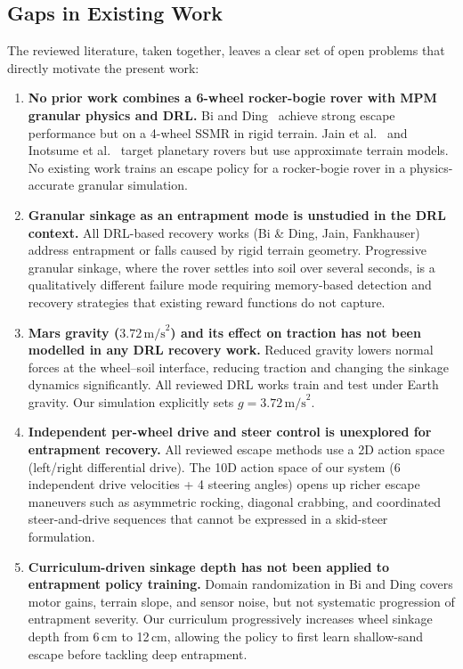 \documentclass[12pt,a4paper]{article}
\begin{document}
\subsection{Gaps in Existing Work}

The reviewed literature, taken together, leaves a clear set of open problems that directly motivate the present work:

\begin{enumerate}

    \item \textbf{No prior work combines a 6-wheel rocker-bogie rover with MPM granular physics and DRL.}
    Bi and Ding~\cite{bi2026escape} achieve strong escape performance but on a 4-wheel SSMR in rigid terrain. Jain et al.~\cite{jain2019} and Inotsume et al.~\cite{inotsume2020} target planetary rovers but use approximate terrain models. No existing work trains an escape policy for a rocker-bogie rover in a physics-accurate granular simulation.

    \item \textbf{Granular sinkage as an entrapment mode is unstudied in the DRL context.}
    All DRL-based recovery works (Bi \& Ding, Jain, Fankhauser) address entrapment or falls caused by rigid terrain geometry. Progressive granular sinkage, where the rover settles into soil over several seconds, is a qualitatively different failure mode requiring memory-based detection and recovery strategies that existing reward functions do not capture.

    \item \textbf{Mars gravity ($3.72\,\text{m/s}^2$) and its effect on traction has not been modelled in any DRL recovery work.}
    Reduced gravity lowers normal forces at the wheel--soil interface, reducing traction and changing the sinkage dynamics significantly. All reviewed DRL works train and test under Earth gravity. Our simulation explicitly sets $g = 3.72\,\text{m/s}^2$.

    \item \textbf{Independent per-wheel drive and steer control is unexplored for entrapment recovery.}
    All reviewed escape methods use a 2D action space (left/right differential drive). The 10D action space of our system (6 independent drive velocities + 4 steering angles) opens up richer escape maneuvers such as asymmetric rocking, diagonal crabbing, and coordinated steer-and-drive sequences that cannot be expressed in a skid-steer formulation.

    \item \textbf{Curriculum-driven sinkage depth has not been applied to entrapment policy training.}
    Domain randomization in Bi and Ding covers motor gains, terrain slope, and sensor noise, but not systematic progression of entrapment severity. Our curriculum progressively increases wheel sinkage depth from 6\,cm to 12\,cm, allowing the policy to first learn shallow-sand escape before tackling deep entrapment.


\end{enumerate}
\end{document}
